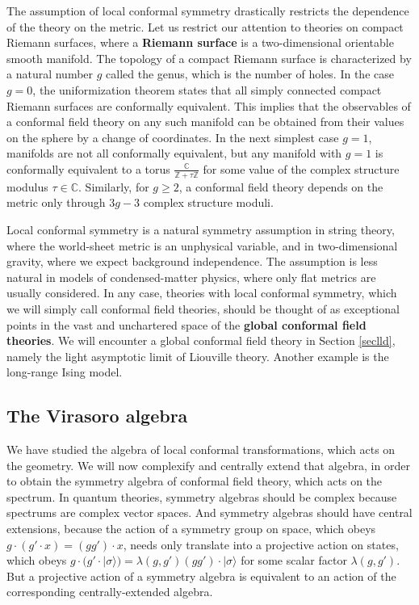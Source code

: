 \documentclass[12pt, a4paper, notitlepage, twoside]{report}
\numberwithin{equation}{section}
\theoremstyle{break}
\begin{document}
The assumption of local conformal symmetry drastically restricts the dependence of the theory on the metric.
Let us restrict our attention to theories on compact Riemann surfaces, where a \textbf{\boldmath Riemann surface} is a two-dimensional orientable smooth manifold.
The topology of a compact Riemann surface is characterized by a natural number $g$ called the genus, which is the number of holes.
In the case $g=0$, the uniformization theorem states that all simply connected compact Riemann surfaces are conformally equivalent. 
This implies that the observables of a conformal field theory on any such manifold can be obtained from their values on the sphere by a change of coordinates.
In the next simplest case $g=1$, manifolds are not all conformally equivalent, but any manifold with $g=1$ is conformally equivalent to a torus $\frac{{\mathbb{C}}}{{\mathbb{Z}}+\tau{\mathbb{Z}}}$ for some value of the
complex structure modulus $\tau \in {\mathbb{C}}$.
Similarly, for $g\geq 2$, a conformal field theory depends on the metric only through $3g-3$ complex structure moduli. 

Local conformal symmetry is a natural symmetry assumption in string theory, where the world-sheet metric is an unphysical variable, and in two-dimensional gravity, where we expect background independence.
The assumption is less natural in models of condensed-matter physics, where only flat metrics are usually considered.
In any case, theories with local conformal symmetry, which we will simply call conformal field theories, should be thought of as exceptional points in the vast and unchartered space of the \textbf{\boldmath global conformal field theories}.
We will encounter a global conformal field theory in Section \ref{seclld}, namely the light asymptotic limit of Liouville theory.
Another example is the long-range Ising model. 


\subsection{The Virasoro algebra \label{secvir}}

We have studied the algebra of local conformal transformations, which acts on the geometry. 
We will now complexify and centrally extend that algebra, in order to obtain the symmetry algebra of conformal field theory, which acts on the spectrum. 
In quantum theories, symmetry algebras should be complex because spectrums are complex vector spaces. And symmetry algebras should have central extensions, because the action of a symmetry group on space, which obeys $g\cdot(g'\cdot x) = (gg')\cdot x$, needs only translate into a projective action on states, which obeys $g\cdot(g'\cdot|\sigma\rangle) = \lambda(g,g') (gg')\cdot |\sigma\rangle$ for some scalar factor $\lambda(g,g')$. 
But a projective action of a symmetry algebra is equivalent to an action of the corresponding centrally-extended algebra. 
\end{document}
